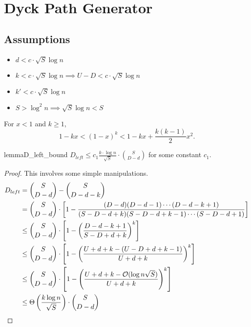 \section{Dyck Path Generator}%
\label{sec:dyck_appendix}

\subsection{Assumptions}%
\label{sec:assumptions}
\begin{itemize}
    \item $d < c\cdot \sqrt S \log n$
    \item $k < c\cdot \sqrt S \log n \implies U-D < c\cdot \sqrt S \log n$
    \item $k' < c\cdot \sqrt S \log n$
    \item $S > \log^2 n \implies \sqrt S \log n < S$
\end{itemize}

\begin{lemma}
\label{lem:taylor_bound}
For $x < 1$ and $k\ge 1$,
\[
1-kx < (1-x)^k < 1 - kx + \frac{k(k-1)}{2}x^2.
\]
\end{lemma}


\begin{restatable}{lemma}{D_left_bound}
\label{lem:D_left_bound}
$D_{left} \le c_1 \frac{ k\cdot\log n}{\sqrt{S}}\cdot{{S}\choose{D-d}}$ for some constant $c_1$.
\end{restatable}
\begin{proof}
This involves some simple manipulations.
\begin{align}
D_{left} &= {{S}\choose{D-d}}-{{S}\choose{D-d-k}}\\
&= {{S}\choose{D-d}}\cdot \left[1-\frac{(D-d)(D-d-1)\cdots(D-d-k+1)}{(S-D-d+k)(S-D-d+k-1)\cdots(S-D-d+1)}\right]\\
&\le {{S}\choose{D-d}}\cdot \left[1-\left(\frac{D-d-k+1}{S-D+d+k}\right)^k\right]\\
&\le {{S}\choose{D-d}}\cdot \left[1-\left(\frac{U+d+k-(U-D+d+k-1)}{U+d+k}\right)^k\right]\\
&\le {{S}\choose{D-d}}\cdot \left[1-\left(\frac{U+d+k-\Bo(\log n\sqrt{S})}{U+d+k}\right)^k\right]\\
&\le \Theta \left( \frac{k\log n}{\sqrt{S}} \right) \cdot{{S}\choose{D-d}}
\end{align}
\end{proof}

